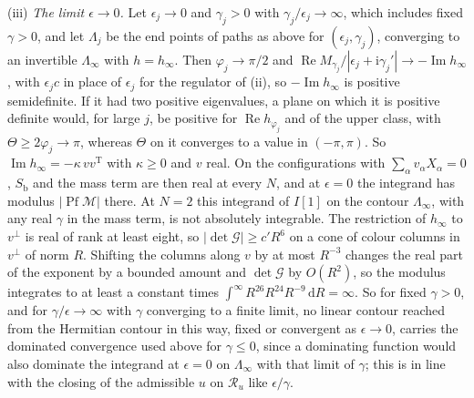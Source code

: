 (iii) \emph{The limit \(\epsilon\to0\).} Let \(\epsilon_j\to0\) and \(\gamma_j>0\) with \(\gamma_j/\epsilon_j\to\infty\), which includes fixed \(\gamma>0\), and let \(\Lambda_j\) be the end points of paths as above for \((\epsilon_j,\gamma_j)\), converging to an invertible \(\Lambda_\infty\) with \(h=h_\infty\). Then \(\varphi_j\to\pi/2\) and \(\operatorname{Re}M_{\gamma_j}/|\epsilon_j+\mathrm i\gamma_j'|\to-\operatorname{Im}h_\infty\), with \(\epsilon_jc\) in place of \(\epsilon_j\) for the regulator of (ii), so \(-\operatorname{Im}h_\infty\) is positive semidefinite. If it had two positive eigenvalues, a plane on which it is positive definite would, for large \(j\), be positive for \(\operatorname{Re}h_{\varphi_j}\) and of the upper class, with \(\Theta\ge2\varphi_j\to\pi\), whereas \(\Theta\) on it converges to a value in \((-\pi,\pi)\). So \(\operatorname{Im}h_\infty=-\kappa\,vv^{\mathrm T}\) with \(\kappa\ge0\) and \(v\) real. On the configurations with \(\sum_\alpha v_\alpha X_\alpha=0\), \(S_{\mathrm b}\) and the mass term are then real at every \(N\), and at \(\epsilon=0\) the integrand has modulus \(|\operatorname{Pf}\mathcal M|\) there. At \(N=2\) this integrand of \(I[1]\) on the contour \(\Lambda_\infty\), with any real \(\gamma\) in the mass term, is not absolutely integrable. The restriction of \(h_\infty\) to \(v^\perp\) is real of rank at least eight, so \(|\det\mathcal G|\ge c'R^6\) on a cone of colour columns in \(v^\perp\) of norm \(R\). Shifting the columns along \(v\) by at most \(R^{-3}\) changes the real part of the exponent by a bounded amount and \(\det\mathcal G\) by \(O(R^2)\), so the modulus integrates to at least a constant times \(\int^\infty R^{26}R^{24}R^{-9}\,\mathrm dR=\infty\). So for fixed \(\gamma>0\), and for \(\gamma/\epsilon\to\infty\) with \(\gamma\) converging to a finite limit, no linear contour reached from the Hermitian contour in this way, fixed or convergent as \(\epsilon\to0\), carries the dominated convergence used above for \(\gamma\le0\), since a dominating function would also dominate the integrand at \(\epsilon=0\) on \(\Lambda_\infty\) with that limit of \(\gamma\); this is in line with the closing of the admissible \(u\) on \(\mathcal R_u\) like \(\epsilon/\gamma\).


